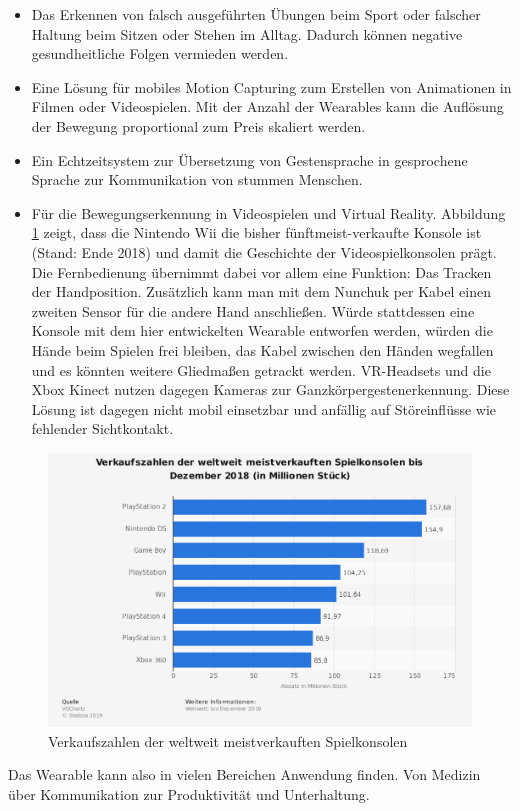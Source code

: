\begin{itemize}
  \item Das Erkennen von falsch ausgeführten Übungen beim Sport oder falscher Haltung beim Sitzen oder Stehen im Alltag.
	Dadurch können negative gesundheitliche Folgen vermieden werden.
  \item Eine Lösung für mobiles Motion Capturing zum Erstellen von Animationen in Filmen oder Videospielen.
	Mit der Anzahl der Wearables kann die Auflösung der Bewegung proportional zum Preis skaliert werden.
  \item Ein Echtzeitsystem zur Übersetzung von Gestensprache in gesprochene Sprache zur Kommunikation von stummen Menschen.
  \item Für die Bewegungserkennung in Videospielen und Virtual Reality.
	Abbildung \ref{fig:stat_konsolen} zeigt, dass die Nintendo Wii die bisher fünftmeist-verkaufte Konsole ist (Stand: Ende 2018) und damit die Geschichte der Videospielkonsolen prägt.
	Die Fernbedienung übernimmt dabei vor allem eine Funktion: Das Tracken der Handposition.
	Zusätzlich kann man mit dem Nunchuk per Kabel einen zweiten Sensor für die andere Hand anschließen.
	Würde stattdessen eine Konsole mit dem hier entwickelten Wearable entworfen werden, würden die Hände beim Spielen frei bleiben, das Kabel zwischen den Händen wegfallen und es könnten weitere Gliedmaßen getrackt werden.
	VR-Headsets und die Xbox Kinect nutzen dagegen Kameras zur Ganzkörpergestenerkennung.
	Diese Lösung ist dagegen nicht mobil einsetzbar und anfällig auf Störeinflüsse wie fehlender Sichtkontakt.
\end{itemize}
\begin{figure}[h]
  \centering
  \includegraphics[width=0.75\linewidth]{res/01_statistic_id160549_weltweit-meistverkaufte-spielkonsolen-bis-dezember-2018.png}
  \caption{Verkaufszahlen der weltweit meistverkauften Spielkonsolen \cite{statistik_konsolen}}
  \label{fig:stat_konsolen}
\end{figure}
Das Wearable kann also in vielen Bereichen Anwendung finden. Von Medizin über Kommunikation zur Produktivität und Unterhaltung.

